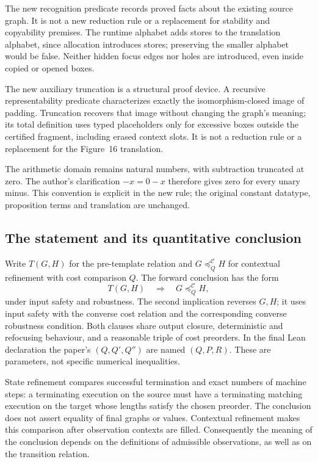 The new recognition predicate records proved facts about the existing source
graph. It is not a new reduction rule or a replacement for stability and
copyability premises. The runtime alphabet adds stores to the translation
alphabet, since allocation introduces stores; preserving the smaller alphabet
would be false. Neither hidden focus edges nor holes are introduced, even
inside copied or opened boxes.

The new auxiliary truncation is a structural proof device. A recursive
representability predicate characterizes exactly the isomorphism-closed image
of padding. Truncation recovers that image without changing the graph's
meaning; its total definition uses typed placeholders only for excessive
boxes outside the certified fragment, including erased context slots.
It is not a reduction rule or a replacement for the Figure~16 translation.

The arithmetic domain remains natural numbers, with subtraction truncated at
zero. The author's clarification $-x=0-x$ therefore gives zero for every unary
minus. This convention is explicit in the new rule; the original constant
datatype, proposition terms and translation are unchanged.

\subsection{The statement and its quantitative conclusion}

Write $T(G,H)$ for the pre-template relation and $G\preceq_Q^{\mathcal C}H$
for contextual refinement with cost comparison $Q$. The forward conclusion
has the form
\[
 T(G,H)\quad\Longrightarrow\quad G\preceq_Q^{\mathcal C}H,
\]
under input safety and robustness. The second implication reverses $G,H$;
it uses input safety with the converse cost relation and the corresponding
converse robustness condition. Both clauses share output closure,
deterministic and refocusing behaviour, and a reasonable triple of cost
preorders. In the final Lean declaration the paper's $(Q,Q',Q'')$ are named
$(Q,P,R)$. These are parameters, not specific numerical inequalities.

State refinement compares successful termination and exact numbers of machine
steps: a terminating execution on the source must have a terminating matching
execution on the target whose lengths satisfy the chosen preorder. The
conclusion does not assert equality of final graphs or values. Contextual
refinement makes this comparison after observation contexts are filled.
Consequently the meaning of the conclusion depends on the definitions of
admissible observations, as well as on the transition relation.

